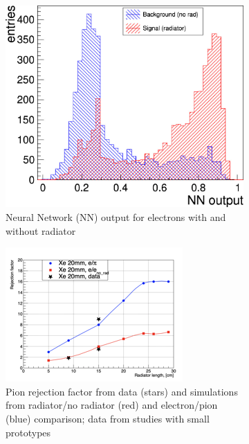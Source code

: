 \documentclass[%
preprint,
nofootinbib,
 amsmath,amssymb,
 aps,
floatfix,
]{revtex4-1}
\begin{document}
\begin{figure}[h]
  \begin{subfigure}[b]{0.49\textwidth}
    \includegraphics[width=\textwidth]{./fig/GEM_TRD_NNoutput.jpg}
    \caption{Neural Network (NN) output for electrons with and without 
radiator}
    \label{fig:NNout}
  \end{subfigure}
  \begin{subfigure}[b]{0.40\textwidth}
    \includegraphics[width=\textwidth]{./fig/pion_rejection.png}
    \caption{Pion rejection factor from data (stars) 
and simulations from radiator/no radiator (red)
and electron/pion (blue) comparison;
data from studies with small prototypes}
    \label{fig:rejection}
  \end{subfigure}
  \caption{
}
  \label{fig:BH_pove_pi}
\end{figure}
\end{document}
